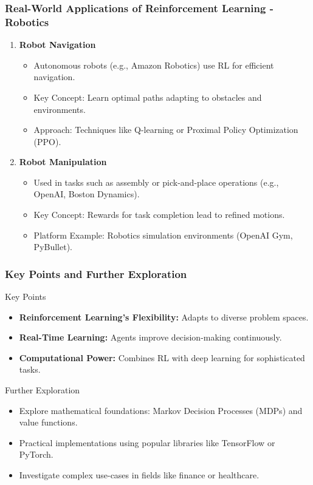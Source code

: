 \documentclass[aspectratio=169]{beamer}
\begin{document}
\begin{frame}[fragile]
    \frametitle{Real-World Applications of Reinforcement Learning - Robotics}
    \begin{enumerate}
        \item \textbf{Robot Navigation}
        \begin{itemize}
            \item Autonomous robots (e.g., Amazon Robotics) use RL for efficient navigation.
            \item Key Concept: Learn optimal paths adapting to obstacles and environments.
            \item Approach: Techniques like Q-learning or Proximal Policy Optimization (PPO).
        \end{itemize}

        \item \textbf{Robot Manipulation}
        \begin{itemize}
            \item Used in tasks such as assembly or pick-and-place operations (e.g., OpenAI, Boston Dynamics).
            \item Key Concept: Rewards for task completion lead to refined motions.
            \item Platform Example: Robotics simulation environments (OpenAI Gym, PyBullet).
        \end{itemize}
    \end{enumerate}
\end{frame}

\begin{frame}[fragile]
    \frametitle{Key Points and Further Exploration}
    \begin{block}{Key Points}
        \begin{itemize}
            \item \textbf{Reinforcement Learning's Flexibility:} Adapts to diverse problem spaces.
            \item \textbf{Real-Time Learning:} Agents improve decision-making continuously.
            \item \textbf{Computational Power:} Combines RL with deep learning for sophisticated tasks.
        \end{itemize}
    \end{block}

    \begin{block}{Further Exploration}
        \begin{itemize}
            \item Explore mathematical foundations: Markov Decision Processes (MDPs) and value functions.
            \item Practical implementations using popular libraries like TensorFlow or PyTorch.
            \item Investigate complex use-cases in fields like finance or healthcare.
        \end{itemize}
    \end{block}
\end{frame}
\end{document}
